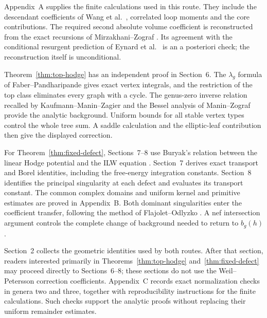 Appendix~A supplies the finite calculations used in this route.
They include the descendant coefficients of Wang et al.\
\cite[Lemma 7.2 and Appendix C.1]{W26}, correlated loop moments
and the core contributions. The required second absolute volume
coefficient is reconstructed from the exact recursions of
Mirzakhani--Zograf \cite[\S 2]{MZ15}. Its agreement with the
conditional resurgent prediction of Eynard et al.\
\cite[\S 6.1, (6.10)]{EGGLS24} is an a posteriori check;
the reconstruction itself is unconditional.

Theorem~\ref{thm:top-hodge} has an independent proof in Section~6.
The $\lambda_g$ formula of Faber--Pandharipande
\cite[Theorem 1]{FP03} gives exact vertex integrals, and the
restriction of the top class eliminates every graph with a cycle.
The genus-zero inverse relation recalled by Kaufmann--Manin--Zagier
\cite[(0.8)]{KMZ96v1} and the Bessel analysis of Manin--Zograf
\cite[\S 6, (17) and Proof 6.3]{MaZ00} provide the analytic
background. Uniform bounds for all stable vertex types control
the whole tree sum. A saddle calculation and the elliptic-leaf
contribution then give the displayed correction.

For Theorem~\ref{thm:fixed-defect}, Sections~7--8 use Buryak's relation
between the linear Hodge potential and the ILW equation
\cite[Theorem 1.1]{Bur15}. Section~7 derives exact transport and
Borel identities, including the free-energy integration constants.
Section~8 identifies the principal singularity at each defect and
evaluates its transport constant. The common complex domains and
uniform kernel and primitive estimates are proved in Appendix~B.
Both dominant singularities enter the coefficient transfer,
following the method of Flajolet--Odlyzko \cite[\S 2]{FO90}.
A nef intersection argument controls the complete change of
background needed to return to $b_g(h)$.

Section~2 collects the geometric identities used by both routes.
After that section, readers interested primarily in
Theorems~\ref{thm:top-hodge} and~\ref{thm:fixed-defect}
may proceed directly to Sections~6--8; these sections do not use
the Weil--Petersson correction coefficients. Appendix~C records
exact normalization checks in genera two and three, together with
reproducibility instructions for the finite calculations. Such checks
support the analytic proofs without replacing their uniform
remainder estimates.
